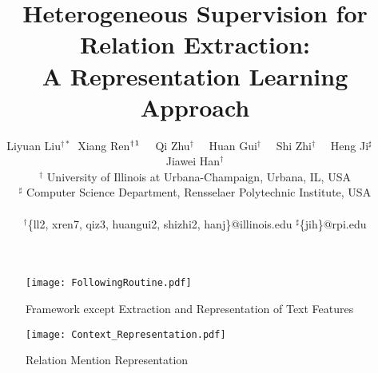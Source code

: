 \documentclass[11pt,letterpaper]{article}
\title{Heterogeneous Supervision for Relation Extraction: \\A Representation Learning Approach}
\author{
Liyuan Liu$^{\dag *}\ $ 
Xiang Ren$^{\dag}\thanks{\enspace Equal contribution.}\quad$ Qi Zhu$^{\dag}\quad$ Huan Gui$^{\dag}\quad$ Shi Zhi$^{\dag}\quad$ Heng Ji$^{\sharp}\quad$ Jiawei Han$^{\dag}$\\[0.5ex]
{$^{\dag}$ University of Illinois at Urbana-Champaign, Urbana, IL, USA}\\
{$^{\sharp}$ Computer Science Department, Rensselaer Polytechnic Institute, USA}\\
{
\begin{small}
$^{\dag}$\{ll2, xren7, qiz3, huangui2, shizhi2, hanj\}@illinois.edu $^{\sharp}$\{jih\}@rpi.edu
\end{small}
}
}
\begin{document}
\maketitle



\begin{figure*}[ht!]
  \centering
    \texttt{[image: FollowingRoutine.pdf]}
  \caption{\our Framework except Extraction and Representation of Text Features}
  \label{fig:Framework}
\end{figure*}



\begin{figure}[t]
  \centering
  \centerline{
    \texttt{[image: Context\_Representation.pdf]}
  }
  \caption{Relation Mention Representation}
  \label{fig:context_rep}
\end{figure}







% 

\newpage


\end{document}
